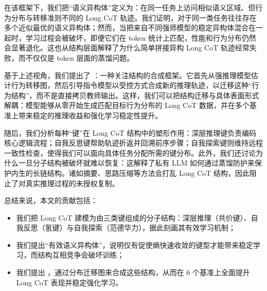在该框架下，我们把“语义异构体”定义为：在同一任务上访问相似语义区域、但行为分布与转移准则不同的 Long CoT 轨迹。我们证明，对于同一类任务往往存在多个近似最优的语义异构体；然而，当把来自不同强师模型的稳定异构体混合在一起时，学习过程会被破坏，即便它们在 token 统计上匹配，性能和行为分布仍然会显著退化。这也从结构层面解释了为什么简单拼接异构 Long CoT 轨迹经常失败，而不仅仅是 token 层面的蒸馏问题。

基于上述视角，我们提出了 \method：一种关注结构的合成框架。它首先从强推理模型估计行为转移图，然后引导指令模型以受控方式合成新的推理轨迹，以迁移这种“行为结构”，而不是直接拷贝教师输出。这样，我们可以把结构迁移与具体表面形式解耦：模型能够从零开始生成匹配目标行为分布的 Long CoT 数据，并在多个基准上带来稳定的推理收益和强化学习稳定性提升。

随后，我们分析每种“键”在 Long CoT 结构中的塑形作用：深层推理键负责编码核心逻辑流程；自我反思键帮助轨迹折返并回溯前序步骤；自我探索键则维持远程一致性检查，使得我们可以面向具体任务分配所需的键分布。此外，我们还讨论为什么一旦分子结构被破坏就难以恢复：这解释了私有 LLM 如何通过蒸馏防护来保护内生的长链结构。诸如摘要、思路压缩等方法会打乱 Long CoT 结构，因此阻止了对真实推理过程的未授权复制。

总结来说，本文的贡献包括：
\begin{itemize}[leftmargin=16pt, itemsep=0pt, topsep=0pt]
\item 我们把 Long CoT 建模为由三类键组成的分子结构：深层推理（共价键）、自我反思（氢键）与自我探索（范德华力），据此刻画其有效学习机制；
\item 我们提出“有效语义异构体”，说明仅有促使熵快速收敛的键型才能带来稳定学习，而结构互相竞争会破坏训练；
\item 我们提出 \method，通过分布迁移图来合成这些结构，从而在 6 个基准上全面提升 Long CoT 表现并稳定强化学习。
\end{itemize}
